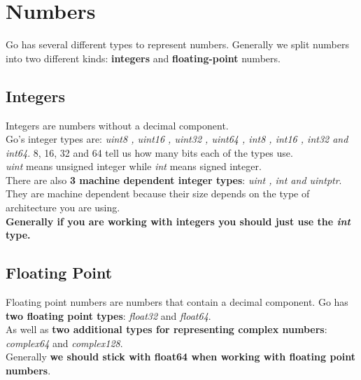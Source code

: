 \documentclass[10pt,letterpaper]{report}
\begin{document}
\section{Numbers}
Go has several different types to represent numbers. Generally we split numbers into two different kinds: \textbf{integers} and \textbf{floating-point} numbers.
\subsection{Integers}
Integers are numbers without a decimal component.\\
Go's integer types are: \textit{uint8 , uint16 , uint32 , uint64 , int8 , int16 , int32 and int64}. 8, 16, 32 and 64 tell us how many bits each of the types use.\\
\textit{uint} means unsigned integer while \textit{int} means signed integer.\\
There are also \textbf{3 machine dependent integer types}: \textit{uint , int and uintptr}. They are machine dependent because their size depends on the type of architecture you are using.\\
\textbf{Generally if you are working with integers you should just use the \textit{int} type.}
\subsection{Floating Point}
Floating point numbers are numbers that contain a decimal component.
Go has \textbf{two floating point types}: \textit{float32} and \textit{float64}. \\
As well as \textbf{two additional types for representing complex numbers}: \textit{complex64} and \textit{complex128}.\\
Generally \textbf{we should stick with float64 when working with floating point numbers}.
\end{document}
